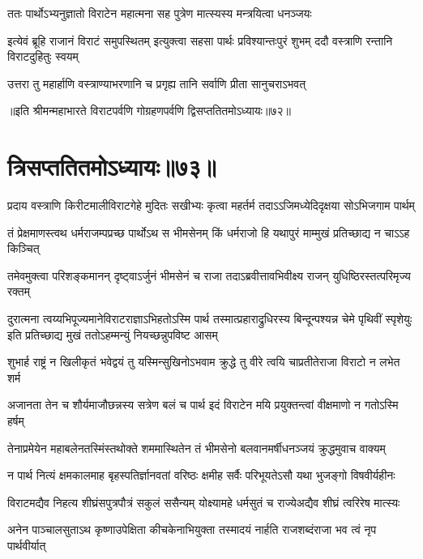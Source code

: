\twolineshloka
{ततः पार्थोऽभ्यनुज्ञातो विराटेन महात्मना}
{सह पुत्रेण मात्स्यस्य मन्त्रयित्वा धनञ्जयः}


\threelineshloka
{इत्येवं ब्रूहि राजानं विराटं समुपस्थितम्}
{इत्युक्त्वा सहसा पार्थः प्रविश्यान्तःपुरं शुभम्}
{ददौ वस्त्राणि रन्तानि विराटदुहितुः स्वयम्}


\twolineshloka
{उत्तरा तु महार्हाणि वस्त्राण्याभरणानि च}
{प्रगृह्य तानि सर्वाणि प्रीता सानुचराऽभवत्}

॥इति श्रीमन्महाभारते विराटपर्वणि गोग्रहणपर्वणि द्विसप्ततितमोऽध्यायः॥७२॥

\chapter{त्रिसप्ततितमोऽध्यायः॥७३॥ }

\twolineshloka
{प्रदाय वस्त्राणि किरीटमालीविराटगेहे मुदितः सखीभ्यः}
{कृत्वा महर्तर्म तदाऽऽजिमध्येदिदृक्षया सोऽभिजगाम पार्थम्}


\twolineshloka
{तं प्रेक्षमाणस्त्वथ धर्मराजम्पप्रच्छ पार्थोऽथ स भीमसेनम्}
{किं धर्मराजो हि यथापुरं माम्मुखं प्रतिच्छाद्य न चाऽऽह किञ्चित्}


\fourlineindentedshloka
{तमेवमुक्त्वा परिशङ्कमानन्}
{दृष्ट्वाऽर्जुनं भीमसेनं च राजा}
{तदाऽब्रवीत्तावभिवीक्ष्य राजन्}
{युधिष्ठिरस्तत्परिमृज्य रक्तम्}


\threelineshloka
{दुरात्मना त्वय्यभिपूज्यमानेविराटराज्ञाऽभिहतोऽस्मि पार्थ}
{तस्मात्प्रहाराद्रुधिरस्य बिन्दून्पश्यन्न चेमे पृथिवीं स्पृशेयुः}
{इति प्रतिच्छाद्य मुखं ततोऽहम्मन्युं नियच्छन्नुपविष्ट आसम्}


\twolineshloka
{शुभार्ह राष्ट्रं न खिलीकृतं भवेद्वयं तु यस्मिन्सुखिनोऽभवाम}
{क्रुद्धे तु वीरे त्वयि चाप्रतीतेराजा विराटो न लभेत शर्म}


\twolineshloka
{अजानता तेन च शौर्यमाजौछन्नस्य सत्रेण बलं च पार्थ}
{इदं विराटेन मयि प्रयुक्तन्त्वां वीक्षमाणो न गतोऽस्मि हर्षम्}


\twolineshloka
{तेनाप्रमेयेन महाबलेनतस्मिंस्तथोक्ते शममास्थितेन}
{तं भीमसेनो बलवानमर्षीधनञ्जयं क्रुद्धमुवाच वाक्यम्}


\fourlineindentedshloka
{न पार्थ नित्यं क्षमकालमाह}
{बृहस्पतिर्ज्ञानवतां वरिष्ठः}
{क्षमीह सर्वैः परिभूयतेऽसौ}
{यथा भुजङ्गो विषवीर्यहीनः}


\twolineshloka
{विराटमद्यैव निहत्य शीघ्रंसपुत्रपौत्रं सकुलं ससैन्यम्}
{योक्ष्यामहे धर्मसुतं च राज्येअद्यैव शीघ्रं त्वरिरेष मात्स्यः}


\twolineshloka
{अनेन पाञ्चालसुताऽथ कृष्णाउपेक्षिता कीचकेनाभियुक्ता}
{तस्मादयं नार्हति राजशब्दंराजा भव त्वं नृप पार्थवीर्यात्}


